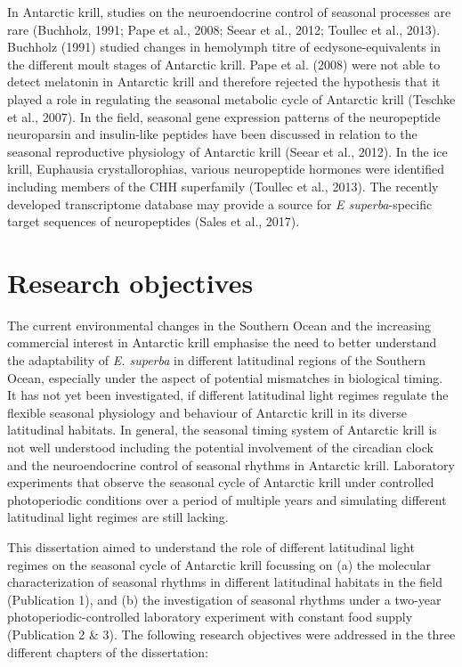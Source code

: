 In Antarctic krill, studies on the neuroendocrine control of seasonal processes
are rare (Buchholz, 1991; Pape et al., 2008; Seear et al., 2012; Toullec et
al., 2013). Buchholz (1991) studied changes in hemolymph titre of
ecdysone-equivalents in the different moult stages of Antarctic krill. Pape et
al. (2008) were not able to detect melatonin in Antarctic krill and therefore
rejected the hypothesis that it played a role in regulating the seasonal
metabolic cycle of Antarctic krill (Teschke et al., 2007).  In the field,
seasonal gene expression patterns of the neuropeptide neuroparsin and
insulin-like peptides have been discussed in relation to the seasonal
reproductive physiology of Antarctic krill (Seear et al., 2012). In the ice
krill, Euphausia crystallorophias, various neuropeptide hormones were
identified including members of the CHH superfamily (Toullec et al., 2013). The
recently developed transcriptome database may provide a source for \textit{E
superba}-specific target sequences of neuropeptides (Sales et al., 2017). 

\section*{Research objectives}
The current environmental changes in the Southern Ocean and the increasing
commercial interest in Antarctic krill emphasise the need to better understand
the adaptability of \textit{E. superba} in different latitudinal regions of the
Southern Ocean, especially under the aspect of potential mismatches in
biological timing. It has not yet been investigated, if different latitudinal
light regimes regulate the flexible seasonal physiology and behaviour of
Antarctic krill in its diverse latitudinal habitats.  In general, the seasonal
timing system of Antarctic krill is not well understood including the potential
involvement of the circadian clock and the neuroendocrine control of seasonal
rhythms in Antarctic krill. Laboratory experiments that observe the seasonal
cycle of Antarctic krill under controlled photoperiodic conditions over a
period of multiple years and simulating different latitudinal light regimes are
still lacking.

This dissertation aimed to understand the role of different latitudinal light
regimes on the seasonal cycle of Antarctic krill focussing on (a) the molecular
characterization of seasonal rhythms in different latitudinal habitats in the
field (Publication 1), and (b) the investigation of seasonal rhythms under a
two-year photoperiodic-controlled laboratory experiment with constant food
supply (Publication 2 \& 3). The following research objectives were addressed
in the three different chapters of the dissertation:

